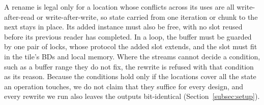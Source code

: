 A rename is legal only for a location whose conflicts across its uses are all write-after-read or write-after-write, so state carried from one iteration or chunk to the next stays in place.
Its added instance must also be free, with no slot reused before its previous reader has completed.
In a loop, the buffer must be guarded by one pair of locks, whose protocol the added slot extends, and the slot must fit in the tile's BDs and local memory.
Where the streams cannot decide a condition, such as a buffer range they do not fix, the rewrite is refused with that condition as its reason.
Because the conditions hold only if the locations cover all the state an operation touches, we do not claim that they suffice for every design, and every rewrite we run also leaves the outputs bit-identical (Section~\ref{subsec:setup}).

